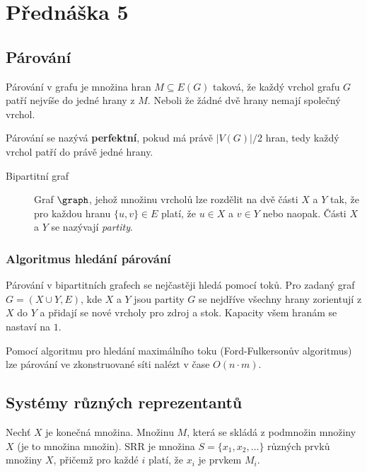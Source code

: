 \section{Přednáška 5}

\subsection{Párování}

Párování v grafu je množina hran \(M \subseteq E(G)\) taková, že každý vrchol grafu $G$ patří nejvíše do jedné hrany z $M$.
Neboli že žádné dvě hrany nemají společný vrchol.

Párování se nazývá \textbf{perfektní}, pokud má právě \(|V(G)| / 2 \) hran, tedy každý vrchol patří do právě jedné hrany.

\begin{description}
    \item[Bipartitní graf] Graf $\graph$, jehož množinu vrcholů lze rozdělit na dvě části $X$ a $Y$ tak, že pro každou hranu $\{u,v\} \in E$ platí, že $u \in X$ a $v \in Y$ nebo naopak.
    Části $X$ a $Y$ se nazývají \textit{partity}.
\end{description}

\subsubsection{Algoritmus hledání párování}

Párování v bipartitních grafech se nejčastěji hledá pomocí toků.
Pro zadaný graf\newline $G=(X \cup Y,E)$, kde $X$ a $Y$ jsou partity $G$ se nejdříve všechny hrany zorientují z $X$ do $Y$ a přidají se nové vrcholy pro zdroj a stok.
Kapacity všem hranám se nastaví na $1$.



Pomocí algoritmu pro hledání maximálního toku (Ford-Fulkersonův algoritmus) lze párování ve zkonstruované síti nalézt v čase \(O(n\cdot{}m)\).

\subsection{Systémy různých reprezentantů}

Nechť $X$ je konečná množina.
Množinu $M$, která se skládá z podmnožin množiny $X$ (je to množina množin).
SRR je množina $S = \{x_1, x_2, \ldots\}$ různých prvků množiny $X$, přičemž pro každé $i$ platí, že $x_i$ je prvkem $M_i$.

